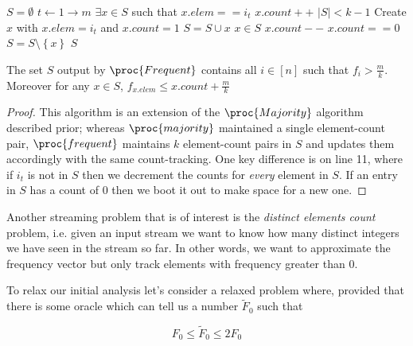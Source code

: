 \documentclass[../notes.tex]{subfiles}
\begin{document}
\begin{codebox}
\li $ S = \emptyset $
\li \For $ t \gets 1 \to m $ \Do
\li     \If $ \exists x \in S  $ such that $ x.elem == i_t $ \Then
\li         $ x.count ++ $
\li     \ElseIf $ |S| < k-1 $ \Then
\li         Create $ x $ with $ x.elem = i_t $ and $ x.count = 1 $
\li         $ S = S \cup x $
\li     \Else 
\li         \For $ x \in S $ \Do
\li             $ x.count -- $
\li             \If $ x.count == 0 $ \Then
\li                     $ S = S \setminus \left\{ x \right\}  $ \End \End \End \End
\li \Return $ S $
\end{codebox}

\begin{theorem}
    The set $ S $ output by $ \proc{Frequent} $ contains all $ i \in [n] $ such that $ f_i > \frac{m}{k} $. Moreover for any $ x \in S $, $ f_{x.elem} \le x.count + \frac{m}{k }$
    
\end{theorem}

\begin{proof}
    This algorithm is an extension of the $ \proc{Majority} $ algorithm described prior; whereas $ \proc{majority} $ maintained a single element-count pair, $ \proc{frequent} $ maintains $ k $ element-count pairs in $ S $ and updates them accordingly with the same count-tracking. 
    One key difference is on line 11, where if $ i_t $ is not in $ S $ then we decrement the counts for \textit{every} element in $ S $. 
    If an entry in $ S $ has a count of 0 then we boot it out to make space for a new one.
\end{proof}



Another streaming problem that is of interest is the \textit{distinct elements count} problem, i.e. given an input stream we want to know how many distinct integers we have seen in the stream so far. 
In other words, we want to approximate the frequency vector but only track elements with frequency greater than 0.


To relax our initial analysis let's consider a relaxed problem where, provided that there is some oracle which can tell us a number $ \tilde{F}_0 $ such that 

\begin{equation}
    F_0 \le \tilde{F}_0 \le  2 F_0
\end{equation}
\end{document}
